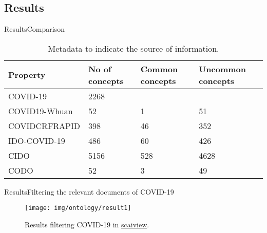 \documentclass[10pt]{beamer}
\newcommand{\1}{
        	\setbeamertemplate{background}{
        		\texttt{[image: img/1]}
        		\tikz[overlay] \fill[fill opacity=0.75,fill=white] (0,0) rectangle (-\paperwidth,\paperheight);
        	}
}
\begin{document}
\subsection{Results}

\begin{frame}{Results}{Comparison}	
	\begin{table}
		\setlength{\tabcolsep}{0.5em} %
		{\renewcommand{\arraystretch}{1.2}%
			\begin{tabular}{p{3cm} p{2cm} p{2cm} p{2cm}}			 
				\textbf{Property} & \textbf{No of concepts} & \textbf{Common concepts} & \textbf{Uncommon concepts} \\
				\hline 
				COVID-19 		& 2268 & & \\
				COVID19-Whuan 	& 52 & 1 & 51  \\
				COVIDCRFRAPID	& 398 & 46 & 352  \\
				IDO-COVID-19 	& 486 & 60 & 426  \\
				CIDO	 		& 5156 & 528 & 4628  \\
				CODO	& 52 & 3 & 49  \\
				\hline 
			\end{tabular}
		}
		\caption{Metadata to indicate the source of information.}
	\end{table}	
\end{frame}


\begin{frame}{Results}{Filtering the relevant documents of COVID-19}	
	\begin{figure}
		\centering
		\texttt{[image: img/ontology/result1]}
		\caption{Results filtering COVID-19 in \href{https://covid.scaiview.com/results}{scaiview}.}
	\end{figure}
\end{frame}
\end{document}
